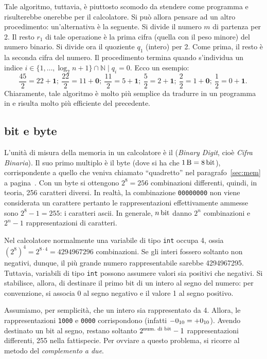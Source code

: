 Tale algoritmo, tuttavia, è piuttosto scomodo da stendere come programma e risulterebbe onerebbe per il calcolatore. Si può allora pensare ad un altro procedimento: un'alternativa è la seguente.
Si divide il numero $m$ di partenza per \num{2}.
Il resto $r_1$ di tale operazione è la prima cifra (quella con il peso minore) del numero binario.
Si divide ora il quoziente $q_1$ (intero) per \num{2}.
Come prima,  il resto è la seconda cifra del numero.
Il procedimento termina quando s'individua un indice $i\in\{1,\dots,\log_2n+1\}\cap\mathbb{N} \mid q_{i}=0$.
Ecco un esempio:
\[
\dfrac{45}{2}=22+\mathbf{1};\ 
\dfrac{22}{2}=11+\mathbf{0};\ 
\dfrac{11}{2}=5+\mathbf{1};\ 
\dfrac{5}{2}=2+\mathbf{1};\ 
\dfrac{2}{2}=1+\mathbf{0};\ 
\dfrac{1}{2}=0+\mathbf{1}.\ 
\]
Chiaramente, tale algoritmo è molto più semplice da tradurre in un programma in  e risulta molto più efficiente del precedente.

	\subsection{bit e byte}
L'unità di misura della memoria in un calcolatore è il \si{\bit} (\emph{Binary Digit}, cioè \emph{Cifra Binaria}).
Il suo primo multiplo è il \si{byte} (dove si ha che $\SI{1}{\byte} = \SI{8}{\bit}$), corrispondente a quello che veniva chiamato ``quadretto'' nel paragrafo~\ref{sec:mem} a pagina~\pageref{sec:mem}.
Con un \si{byte} si ottengono $2^8=256$ combinazioni differenti, quindi, in teoria, \num{256} caratteri diversi.
In realtà, la combinazione \lstinline!00000000! non viene considerata un carattere pertanto le rappresentazioni effettivamente ammesse sono $2^8-1=255$: i caratteri \acs{ascii}.
In generale, $n\,\si{\bit}$ danno $2^n$ combinazioni e $2^n-1$ rappresentazioni di caratteri.

Nel calcolatore normalmente una variabile di tipo \lstinline!int! occupa \SI{4}{\byte}, ossia $(2^8)^4=2^{8\cdot4}=\num{4294967296}$ combinazioni.
Se gli interi fossero soltanto non negativi, dunque, il più grande numero rappresentabile sarebbe \num{4294967295}.
Tuttavia, variabili di tipo \lstinline!int! possono assumere valori sia positivi che negativi.
Si stabilisce, allora, di destinare il primo \si{bit} di un intero al segno del numero: per convenzione, si associa \num{0} al segno negativo e  il valore \num{1} al segno positivo.

Assumiamo, per semplicità, che un intero sia rappresentato da \SI{4}{\bit}.
Allora, le rappresentazioni \lstinline!1000! e \lstinline!0000! corrispondono (infatti $\num[parse-numbers=false]{-0_{10}}=\num[parse-numbers=false]{+0_{10}}$).
Avendo destinato un \si{bit} al segno, restano soltanto $2^{\textup{num.~di \si{\bit}}}-1$ rappresentazioni differenti, \num{255} nella fattispecie.
Per ovviare a questo problema, si ricorre al metodo del \emph{complemento a due}.

